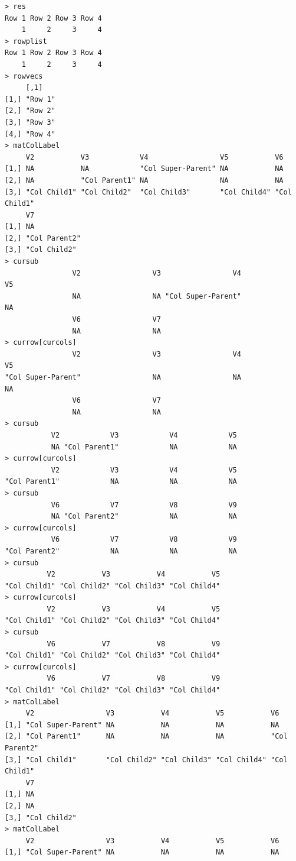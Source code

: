 \documentclass[a4paper]{article}
\begin{document}
\begin{verbatim}
> res 
Row 1 Row 2 Row 3 Row 4 
    1     2     3     4 
> rowplist 
Row 1 Row 2 Row 3 Row 4 
    1     2     3     4 
> rowvecs 
     [,1]   
[1,] "Row 1"
[2,] "Row 2"
[3,] "Row 3"
[4,] "Row 4"
> matColLabel 
     V2           V3            V4                 V5           V6          
[1,] NA           NA            "Col Super-Parent" NA           NA          
[2,] NA           "Col Parent1" NA                 NA           NA          
[3,] "Col Child1" "Col Child2"  "Col Child3"       "Col Child4" "Col Child1"
     V7           
[1,] NA           
[2,] "Col Parent2"
[3,] "Col Child2" 
> cursub 
                V2                 V3                 V4                 V5 
                NA                 NA "Col Super-Parent"                 NA 
                V6                 V7 
                NA                 NA 
> currow[curcols] 
                V2                 V3                 V4                 V5 
"Col Super-Parent"                 NA                 NA                 NA 
                V6                 V7 
                NA                 NA 
> cursub 
           V2            V3            V4            V5 
           NA "Col Parent1"            NA            NA 
> currow[curcols] 
           V2            V3            V4            V5 
"Col Parent1"            NA            NA            NA 
> cursub 
           V6            V7            V8            V9 
           NA "Col Parent2"            NA            NA 
> currow[curcols] 
           V6            V7            V8            V9 
"Col Parent2"            NA            NA            NA 
> cursub 
          V2           V3           V4           V5 
"Col Child1" "Col Child2" "Col Child3" "Col Child4" 
> currow[curcols] 
          V2           V3           V4           V5 
"Col Child1" "Col Child2" "Col Child3" "Col Child4" 
> cursub 
          V6           V7           V8           V9 
"Col Child1" "Col Child2" "Col Child3" "Col Child4" 
> currow[curcols] 
          V6           V7           V8           V9 
"Col Child1" "Col Child2" "Col Child3" "Col Child4" 
> matColLabel 
     V2                 V3           V4           V5           V6           
[1,] "Col Super-Parent" NA           NA           NA           NA           
[2,] "Col Parent1"      NA           NA           NA           "Col Parent2"
[3,] "Col Child1"       "Col Child2" "Col Child3" "Col Child4" "Col Child1" 
     V7          
[1,] NA          
[2,] NA          
[3,] "Col Child2"
> matColLabel 
     V2                 V3           V4           V5           V6           
[1,] "Col Super-Parent" NA           NA           NA           NA           

\end{verbatim}
\end{document}

